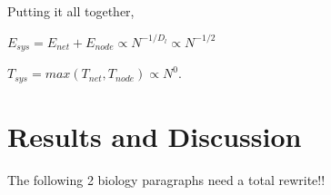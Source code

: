 \documentclass[12pt]{article}
\begin{document}
Putting it all together, 

$E_{sys} = E_{net} + E_{node} \propto N^{-1/D_l} \propto N^{-1/2}$ 

$T_{sys}  = max(T_{net}, T_{node}) \propto N^0$.


%
%
%
%

\section{Results and Discussion}
\label{sec:discussion}

The following 2 biology paragraphs need a total rewrite!!
 
\end{document}
